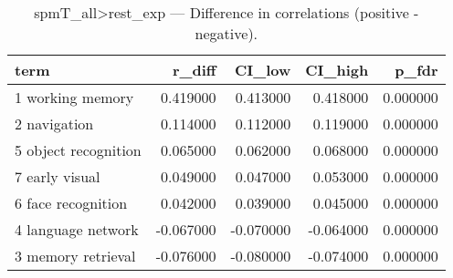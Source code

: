 \begin{table}
\caption{spmT_all>rest_exp — Difference in correlations (positive - negative).}
\label{tab:spmT_all>rest_exp_diff}
\begin{tabular}{lrrrr}
\toprule
term & r\_diff & CI\_low & CI\_high & p\_fdr \\
\midrule
1 working memory & 0.419000 & 0.413000 & 0.418000 & 0.000000 \\
2 navigation & 0.114000 & 0.112000 & 0.119000 & 0.000000 \\
5 object recognition & 0.065000 & 0.062000 & 0.068000 & 0.000000 \\
7 early visual & 0.049000 & 0.047000 & 0.053000 & 0.000000 \\
6 face recognition & 0.042000 & 0.039000 & 0.045000 & 0.000000 \\
4 language network & -0.067000 & -0.070000 & -0.064000 & 0.000000 \\
3 memory retrieval & -0.076000 & -0.080000 & -0.074000 & 0.000000 \\
\bottomrule
\end{tabular}
\end{table}
